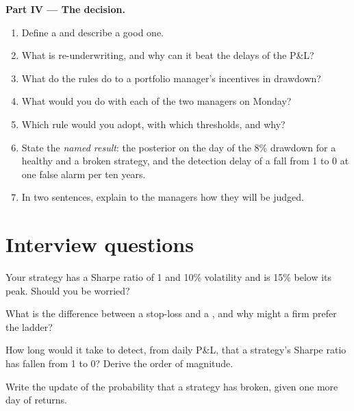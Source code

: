 \begin{problem}
\medskip\noindent\textbf{Part IV --- The decision.}
\begin{enumerate}[resume]
\item Define a  and describe a good one.
\item What is re-underwriting, and why can it beat the delays of the P\&L?
\item What do the rules do to a portfolio manager's incentives in drawdown?
\item What would you do with each of the two managers on Monday?
\item Which rule would you adopt, with which thresholds, and why?
\item State the \emph{named result}: the posterior on the day of the 8\% drawdown for a healthy and a broken strategy, and the detection delay of
a fall from 1 to 0 at one false alarm per ten years.
\item In two sentences, explain to the managers how they will be judged.
\end{enumerate}
\end{problem}

\section{Interview questions}

\begin{interviewq}\label{iq:fm:managing-a-book-through-drawdown:1}
Your strategy has a Sharpe ratio of 1 and 10\% volatility and is 15\% below its peak. Should you be worried?
\end{interviewq}

\begin{interviewq}\label{iq:fm:managing-a-book-through-drawdown:2}
What is the difference between a stop-loss and a , and why might a firm prefer the ladder?
\end{interviewq}

\begin{interviewq}\label{iq:fm:managing-a-book-through-drawdown:3}
How long would it take to detect, from daily P\&L, that a strategy's Sharpe ratio has fallen from 1 to 0? Derive the order of magnitude.
\end{interviewq}

\begin{interviewq}\label{iq:fm:managing-a-book-through-drawdown:4}
Write the update of the probability that a strategy has broken, given one more day of returns.
\end{interviewq}

